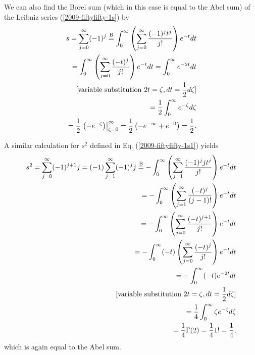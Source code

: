 We can also find the Borel sum (which in this case is equal to the Abel sum)
of the Leibniz series (\ref{2009-fiftyfifty-1s})
by
\begin{equation}
\begin{split}
s= \sum_{j=0}^\infty (-1)^j
\stackrel{{\rm B}}{=}
\int_0^\infty \left(\sum_{j=0}^\infty   \frac{(-1)^j t^j}{j!}\right)   e^{-t} dt  \\
=
\int_0^\infty \left(\sum_{j=0}^\infty   \frac{(- t)^j}{j!}\right)   e^{-t} dt
=
\int_0^\infty    e^{-2t} dt  \\
[\textrm{variable substitution } 2t = \zeta, dt = \frac{1}{2} d \zeta ]\\
=
\frac{1}{2}
\int_0^\infty    e^{-\zeta } d\zeta      \\
=
\frac{1}{2}
\left.     \left(-e^{-\zeta }\right) \right|_{\zeta=0}^\infty
=
\frac{1}{2} \left(- e^{-\infty} + e^{-0}\right) = \frac{1}{2}
.
\end{split}
\end{equation}


A similar calculation for $s^2$ defined in Eq.
(\ref{2009-fiftyfifty-1s1})
yields
\begin{equation}
\begin{split}
s^2= \sum_{j=0}^\infty (-1)^{j+1} j = (-1) \sum_{j=1}^\infty (-1)^j j
\stackrel{{\rm B}}{=}
-\int_0^\infty \left(\sum_{j=1}^\infty   \frac{(-1)^j j t^j}{j!}\right)   e^{-t} dt  \\
=
-\int_0^\infty \left(\sum_{j=1}^\infty   \frac{(-t)^j}{(j-1)!}\right)   e^{-t} dt  \\
=
-\int_0^\infty \left(\sum_{j=0}^\infty   \frac{(-t)^{j+1}}{j!}\right)   e^{-t} dt  \\
=
-\int_0^\infty (-t) \left(\sum_{j=0}^\infty   \frac{(-t)^j}{j!}\right)   e^{-t} dt  \\
=
-\int_0^\infty  (-t)  e^{-2t} dt  \\
[\textrm{variable substitution } 2t = \zeta, dt = \frac{1}{2} d \zeta ]\\
=
\frac{1}{4}
\int_0^\infty  \zeta  e^{-\zeta } d\zeta      \\
=
\frac{1}{4}
\Gamma (2)
=
\frac{1}{4} 1! = \frac{1}{4}
,
\end{split}
\end{equation}
which is again equal to the Abel sum.



\begin{center}
{\color{olive}   \Huge
 \floweroneright
}
\end{center}
